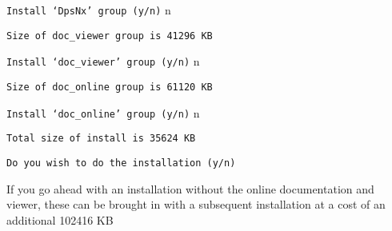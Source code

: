 {\tt Install `DpsNx' group (y/n)} n

{\tt Size of doc\_viewer group is 41296 KB}

{\tt Install `doc\_viewer' group (y/n)} n

{\tt Size of doc\_online group is 61120 KB}

{\tt Install `doc\_online' group (y/n)} n


{\tt Total size of install is 35624 KB}


{\tt Do you wish to do the installation (y/n)}


If you go ahead with an installation without the online documentation and
viewer, these can be brought in with a subsequent installation at a cost of an
additional 102416 KB


